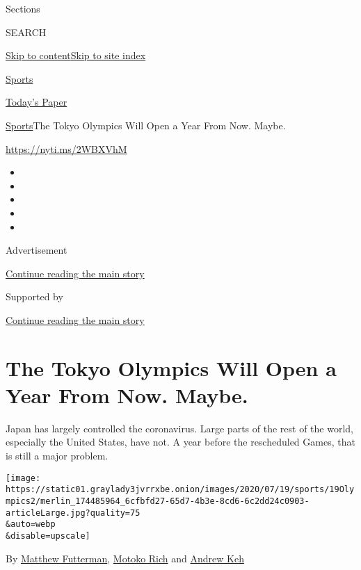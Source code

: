 Sections

SEARCH

\protect\hyperlink{site-content}{Skip to
content}\protect\hyperlink{site-index}{Skip to site index}

\href{https://www.nytimes3xbfgragh.onion/section/sports}{Sports}

\href{https://myaccount.nytimes3xbfgragh.onion/auth/login?response_type=cookie\&client_id=vi}{}

\href{https://www.nytimes3xbfgragh.onion/section/todayspaper}{Today's
Paper}

\href{/section/sports}{Sports}\textbar{}The Tokyo Olympics Will Open a
Year From Now. Maybe.

\url{https://nyti.ms/2WBXVhM}

\begin{itemize}
\item
\item
\item
\item
\item
\end{itemize}

Advertisement

\protect\hyperlink{after-top}{Continue reading the main story}

Supported by

\protect\hyperlink{after-sponsor}{Continue reading the main story}

\hypertarget{the-tokyo-olympics-will-open-a-year-from-now-maybe}{%
\section{The Tokyo Olympics Will Open a Year From Now.
Maybe.}\label{the-tokyo-olympics-will-open-a-year-from-now-maybe}}

Japan has largely controlled the coronavirus. Large parts of the rest of
the world, especially the United States, have not. A year before the
rescheduled Games, that is still a major problem.

\texttt{[image: https://static01.graylady3jvrrxbe.onion/images/2020/07/19/sports/19Olympics2/merlin\_174485964\_6cfbfd27-65d7-4b3e-8cd6-6c2dd24c0903-articleLarge.jpg?quality=75\\\&auto=webp\\\&disable=upscale]}

By
\href{https://www.nytimes3xbfgragh.onion/by/matthew-futterman}{Matthew
Futterman},
\href{https://www.nytimes3xbfgragh.onion/by/motoko-rich}{Motoko Rich}
and \href{https://www.nytimes3xbfgragh.onion/by/andrew-keh}{Andrew Keh}

